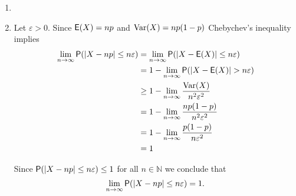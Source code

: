 \begin{enumerate}[label = \textbf{Exercise \arabic*.},wide = 0pt, itemsep=1.5ex]
	\item

	\item Let $\varepsilon > 0$. Since $\mathsf{E}(X) = np$ and $\operatorname{Var}(X) = np(1 - p)$ Chebychev's inequality implies
		\begin{align*}
			\lim_{n \to \infty} \Psf(\abs[0]{X - np} \leq n\varepsilon) &= \lim_{n \to \infty} \Psf(\abs[0]{X - \Esf(X)} \leq n\varepsilon)\\
			&= 1 - \lim_{n \to \infty} \Psf(\abs[0]{X - \Esf(X)} > n\varepsilon)\\
			&\geq1 - \lim_{n \to \infty}\frac{\Var(X)}{n^2\varepsilon^2}\\
			&= 1 - \lim_{n \to \infty} \frac{np(1 - p)}{n^2\varepsilon^2}\\
			&= 1 - \lim_{n\to \infty}\frac{p(1 - p)}{n\varepsilon^2}\\
			&= 1
		\end{align*}

		Since $\Psf(\abs[0]{X - np} \leq n\varepsilon) \leq 1$ for all $n \in \mathbb{N}$ we conclude that
		\begin{equation}
			\lim_{n \to \infty}\Psf(\abs[0]{X - np} \leq n\varepsilon) = 1.
		\end{equation}
\end{enumerate}
\printbibliography

